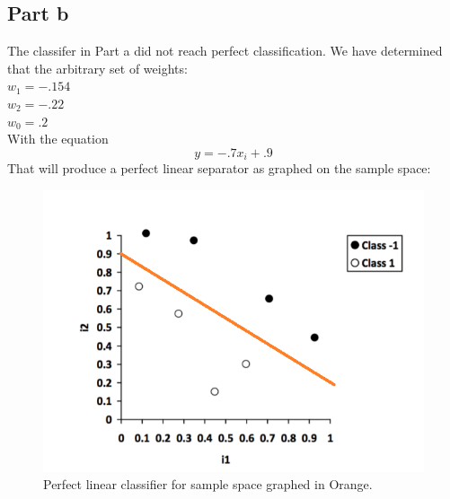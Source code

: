 \documentclass[12pt]{article}
\begin{document}
\subsection*{Part b}
The classifer in Part a did not reach perfect classification.
We have determined that the arbitrary set of weights:\\
$w_1 = -.154$\\
$w_2 = -.22$\\
$w_0 = .2$\\
With the equation 
\begin{equation}
y = -.7x_i + .9
\end{equation}
That will produce a perfect linear separator as graphed on the sample space:
\begin{figure}[H]
    \centering
    \includegraphics[width=1\textwidth]{question_4_plot_b}
    \caption{Perfect linear classifier for sample space graphed in Orange.}
    \label{fig:question_4_plot_b}
\end{figure}
\end{document}
